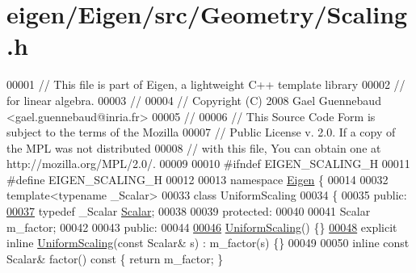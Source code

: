 \hypertarget{eigen_2_eigen_2src_2_geometry_2_scaling_8h_source}{}\section{eigen/\+Eigen/src/\+Geometry/\+Scaling.h}
\label{eigen_2_eigen_2src_2_geometry_2_scaling_8h_source}

\begin{DoxyCode}
00001 \textcolor{comment}{// This file is part of Eigen, a lightweight C++ template library}
00002 \textcolor{comment}{// for linear algebra.}
00003 \textcolor{comment}{//}
00004 \textcolor{comment}{// Copyright (C) 2008 Gael Guennebaud <gael.guennebaud@inria.fr>}
00005 \textcolor{comment}{//}
00006 \textcolor{comment}{// This Source Code Form is subject to the terms of the Mozilla}
00007 \textcolor{comment}{// Public License v. 2.0. If a copy of the MPL was not distributed}
00008 \textcolor{comment}{// with this file, You can obtain one at http://mozilla.org/MPL/2.0/.}
00009 
00010 \textcolor{preprocessor}{#ifndef EIGEN\_SCALING\_H}
00011 \textcolor{preprocessor}{#define EIGEN\_SCALING\_H}
00012 
00013 \textcolor{keyword}{namespace }\hyperlink{namespace_eigen}{Eigen} \{ 
00014 
00032 \textcolor{keyword}{template}<\textcolor{keyword}{typename} \_Scalar>
00033 \textcolor{keyword}{class }UniformScaling
00034 \{
00035 \textcolor{keyword}{public}:
\hyperlink{class_eigen_1_1_uniform_scaling_a04c4339f58f1210c5d4d34b1bd7ae283}{00037}   \textcolor{keyword}{typedef} \_Scalar \hyperlink{class_eigen_1_1_uniform_scaling_a04c4339f58f1210c5d4d34b1bd7ae283}{Scalar};
00038 
00039 \textcolor{keyword}{protected}:
00040 
00041   Scalar m\_factor;
00042 
00043 \textcolor{keyword}{public}:
00044 
\hyperlink{class_eigen_1_1_uniform_scaling_ab17e233af501c69ff47c0dd16f43cc39}{00046}   \hyperlink{class_eigen_1_1_uniform_scaling_ab17e233af501c69ff47c0dd16f43cc39}{UniformScaling}() \{\}
\hyperlink{class_eigen_1_1_uniform_scaling_a3a3e2fa318eb29c2c4f87e23a8a75144}{00048}   \textcolor{keyword}{explicit} \textcolor{keyword}{inline} \hyperlink{class_eigen_1_1_uniform_scaling_a3a3e2fa318eb29c2c4f87e23a8a75144}{UniformScaling}(\textcolor{keyword}{const} Scalar& s) : m\_factor(s) \{\}
00049 
00050   \textcolor{keyword}{inline} \textcolor{keyword}{const} Scalar& factor()\textcolor{keyword}{ const }\{ \textcolor{keywordflow}{return} m\_factor; \}

\end{DoxyCode}
